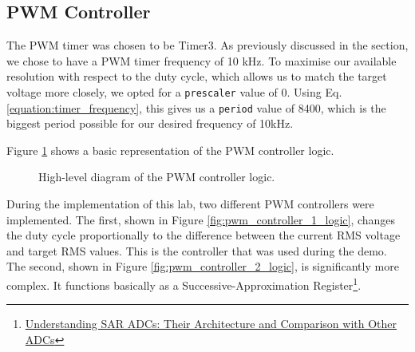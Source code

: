 \subsection{PWM Controller}



The PWM timer was chosen to be Timer3. As previously discussed in the section, we chose to have a PWM timer frequency of 10 kHz. To maximise our available resolution with respect to the duty cycle, which allows us to match the target voltage more closely, we opted for a \verb|prescaler| value of 0. Using Eq. \ref{equation:timer_frequency}, this gives us a \verb|period| value of 8400, which is the biggest period possible for our desired frequency of 10kHz.



Figure \ref{fig:pwm_controller_logic} shows a basic representation of the PWM controller logic. 

\begin{figure}[h]
\caption{\label{fig:pwm_controller_logic}High-level diagram of the PWM controller logic.}
\end{figure}


During the implementation of this lab, two different PWM controllers were implemented. The first, shown in Figure \ref{fig:pwm_controller_1_logic}, changes the duty cycle proportionally to the difference between the current RMS voltage and target RMS values. This is the controller that was used during the demo. The second, shown in Figure \ref{fig:pwm_controller_2_logic}, is significantly more complex. It functions basically as a Successive-Approximation Register\footnote{\href{https://www.maximintegrated.com/en/app-notes/index.mvp/id/1080}{Understanding SAR ADCs: Their Architecture and Comparison with Other ADCs}}. 


